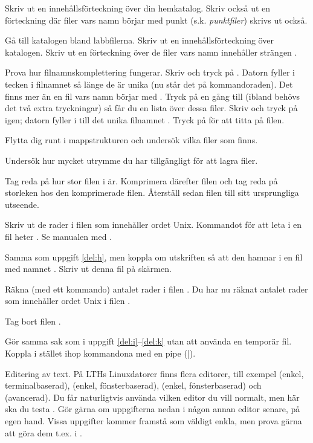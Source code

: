 \begin{Datorarbete}
	\begin{Deluppgifter}
		\item Skriv ut en innehållsförteckning över din hemkatalog. Skriv också ut en förteckning där filer vars namn börjar med punkt (s.k. \emph{punktfiler}) skrivs ut också.
		\item Gå till katalogen  bland labbfilerna. Skriv ut en innehållsförteckning över katalogen. Skriv ut en förteckning över de filer vars namn innehåller strängen .
		\item Prova hur filnamnskomplettering fungerar. Skriv  och tryck på . Datorn fyller i tecken i filnamnet så länge de är unika (nu står det  på kommando\-raden). Det finns mer än en fil vars namn börjar med . Tryck på  en gång till (ibland behövs det två extra tryckningar) så får du en lista över dessa filer. Skriv  och tryck på  igen; datorn fyller i till det unika filnamnet . Tryck på  för att titta på filen.
		\item Flytta dig runt i mappstrukturen och undersök vilka filer som finns.
		\item Undersök hur mycket utrymme du har tillgängligt för att lagra filer.
		\item Tag reda på hur stor filen  i  är. Komprimera därefter filen och tag reda på storleken hos den komprimerade filen. Återställ sedan filen till sitt ursprungliga utseende.
		\item \label{del:h} Skriv ut de rader i filen  som innehåller ordet Unix. Kommandot för att leta i en fil heter . Se manualen med .
		\item \label{del:i} Samma som uppgift \ref{del:h}, men koppla om utskriften så att den hamnar i en fil med namnet . Skriv ut denna fil på skärmen.
		\item Räkna (med ett kommando) antalet rader i filen . Du har nu räknat antalet rader som innehåller ordet Unix i filen .
		\item \label{del:k} Tag bort filen .
		\item Gör samma sak som i uppgift \ref{del:i}--\ref{del:k} utan att använda en temporär fil. Koppla i stället ihop kommandona med en pipe (|).
	\end{Deluppgifter}
	\item Editering av text. På LTHs Linuxdatorer finns flera editorer, till exempel  (enkel, terminalbaserad),  (enkel, fönsterbaserad),  (enkel, fönsterbaserad) och  (avancerad). Du får naturligtvis använda vilken editor du vill normalt, men här ska du testa . Gör gärna om uppgifterna nedan i någon annan editor senare, på egen hand. Vissa uppgifter kommer framstå som väldigt enkla, men prova gärna att göra dem t.ex. i .


\end{Datorarbete}
